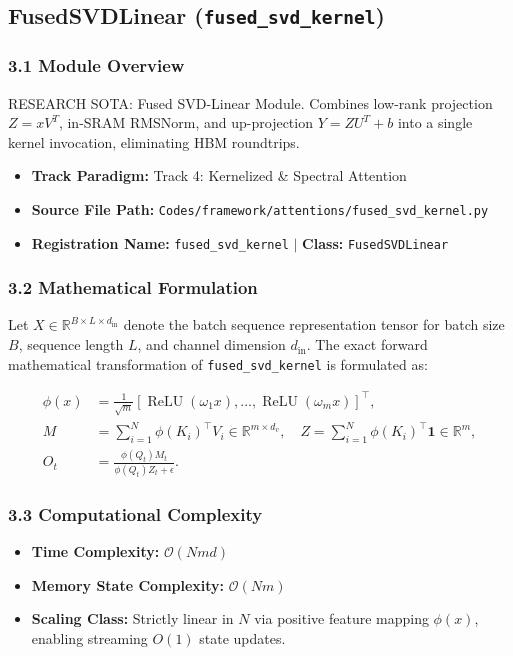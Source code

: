 \subsection{FusedSVDLinear (\texttt{fused\_svd\_kernel})}
\label{sec:app_module_fused\_svd\_kernel}

\subsubsection*{3.1 Module Overview}
RESEARCH SOTA: Fused SVD-Linear Module. Combines low-rank projection $Z = x V^T$, in-SRAM RMSNorm, and up-projection $Y = Z U^T + b$ into a single kernel invocation, eliminating HBM roundtrips.
\begin{itemize}
    \item \textbf{Track Paradigm:} Track 4: Kernelized & Spectral Attention
    \item \textbf{Source File Path:} \texttt{Codes/framework/attentions/fused\_svd\_kernel.py}
    \item \textbf{Registration Name:} \texttt{fused\_svd\_kernel} $\mid$ \textbf{Class:} \texttt{FusedSVDLinear}
\end{itemize}

\subsubsection*{3.2 Mathematical Formulation}
Let $X \in \mathbb{R}^{B \times L \times d_{\text{in}}}$ denote the batch sequence representation tensor for batch size $B$, sequence length $L$, and channel dimension $d_{\text{in}}$. The exact forward mathematical transformation of \texttt{fused\_svd\_kernel} is formulated as:

\begin{align}
\phi(x) &= \frac{1}{\sqrt{m}} \left[ \operatorname{ReLU}(\omega_1 x), \dots, \operatorname{ReLU}(\omega_m x) \right]^\top, \\
M &= \sum_{i=1}^N \phi(K_i)^\top V_i \in \mathbb{R}^{m \times d_v}, \quad Z = \sum_{i=1}^N \phi(K_i)^\top \mathbf{1} \in \mathbb{R}^m, \\
O_t &= \frac{\phi(Q_t) M_t}{\phi(Q_t) Z_t + \epsilon}.
\end{align}


\subsubsection*{3.3 Computational Complexity}
\begin{itemize}
    \item \textbf{Time Complexity:} $\mathcal{O}(N m d)$
    \item \textbf{Memory State Complexity:} $\mathcal{O}(N m)$
    \item \textbf{Scaling Class:} Strictly linear in $N$ via positive feature mapping $\phi(x)$, enabling streaming $O(1)$ state updates.
\end{itemize}

